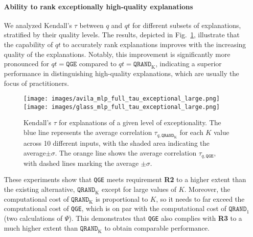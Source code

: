 
\paragraph{Ability to rank exceptionally high-quality explanations}

We analyzed Kendall's $\tau$ between $q$ and $qt$ for different subsets of explanations, stratified by their quality levels. The results, depicted in Fig.~\ref{fig:exhaustive_tau_exceptional}, illustrate that the capability of $qt$ to accurately rank explanations improves with the increasing quality of the explanations. Notably, this improvement is significantly more pronounced for $qt=\texttt{QGE}$ compared to $qt=\texttt{QRAND}_{\text{K}}$, indicating a superior performance in distinguishing high-quality explanations, which are usually the focus of practitioners.

\begin{figure}[htbp]
    \centering
    \texttt{[image: images/avila\_mlp\_full\_tau\_exceptional\_large.png]}
    \texttt{[image: images/glass\_mlp\_full\_tau\_exceptional\_large.png]}
    \caption{Kendall's $\tau$ for explanations of a given level of exceptionality. The blue line represents the average correlation $\tau_{q,\texttt{QRAND}_{\text{K}}}$ for each $K$ value across 10 different inputs, with the shaded area indicating the average$\pm\sigma$. The orange line shows the average correlation $\tau_{q,\texttt{QGE}}$,  with dashed lines marking the average $\pm\sigma$.}
    \label{fig:exhaustive_tau_exceptional}
\end{figure}

These experiments show that \texttt{QGE} meets requirement \textbf{R2} to a higher extent than the existing alternative, $\texttt{QRAND}_{\text{K}}$ except for large values of $K$. Moreover, the computational cost of $\texttt{QRAND}_{\text{K}}$ is proportional to $K$, so it needs to far exceed the computational cost of \texttt{QGE}, which is on par with the computational cost of $\texttt{QRAND}_1$ (two calculations of $\Psi$). This demonstrates that \texttt{QGE} also complies with \textbf{R3} to a much higher extent than $\texttt{QRAND}_{\text{K}}$ to obtain comparable performance.

